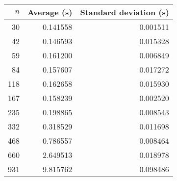 \begin{tabular}{rrr}
$n$ & Average (s) & Standard deviation (s) \\\hline
30 & 0.141558 & 0.001511\\ 
42 & 0.146593 & 0.015328\\ 
59 & 0.161200 & 0.006849\\ 
84 & 0.157607 & 0.017272\\ 
118 & 0.162658 & 0.015930\\ 
167 & 0.158239 & 0.002520\\ 
235 & 0.198865 & 0.008543\\ 
332 & 0.318529 & 0.011698\\ 
468 & 0.786557 & 0.008464\\ 
660 & 2.649513 & 0.018978\\ 
931 & 9.815762 & 0.098486\\ 
\end{tabular}
